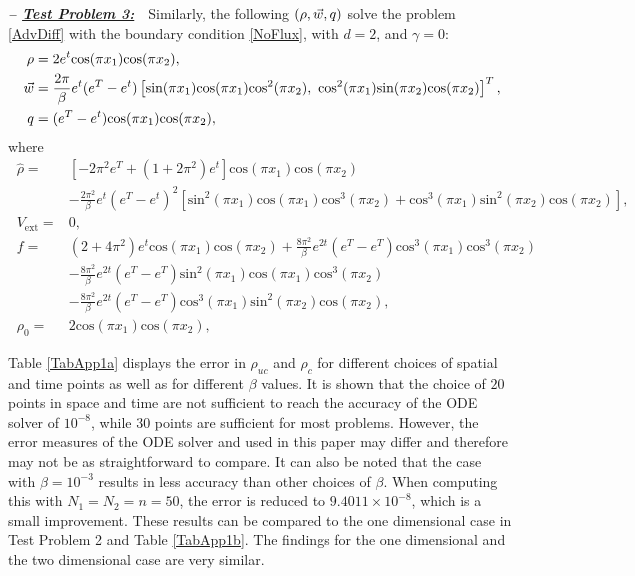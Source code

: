 \textbf{\emph{-- \underline{Test Problem 3:}}}~~Similarly, the following $(\rho,\vec{w},q)$ solve the problem \eqref{AdvDiff} with the boundary condition \eqref{NoFlux}, with $d=2$, and $\gamma =0$:
\begin{align*}
\ \rho={}&2e^{t}\text{cos}(\pi{}x_1)\text{cos}(\pi{}x_2), \\
\ \vec{w}={}&\frac{2\pi}{\beta}e^{t}(e^{T}-e^{t})\left[\text{sin}(\pi{}x_1)\text{cos}(\pi{}x_1)\text{cos}^2(\pi{}x_2),~\text{cos}^2(\pi{}x_1)\text{sin}(\pi{}x_2)\text{cos}(\pi{}x_2)\right]^T, \\
\ \adj={}&(e^{T}-e^{t})\text{cos}(\pi{}x_1)\text{cos}(\pi{}x_2),
\end{align*}
where
\begin{align*}
\ \widehat{\rho}={}&\left[-2\pi^2{}e^{T}+(1+2\pi^2)e^{t}\right]\text{cos}(\pi{}x_1)\text{cos}(\pi{}x_2) \\
\ &-\frac{2\pi^2}{\beta}e^{t}(e^{T}-e^{t})^2\left[\text{sin}^2(\pi{}x_1)\text{cos}(\pi{}x_1)\text{cos}^3(\pi{}x_2)+\text{cos}^3(\pi{}x_1)\text{sin}^2(\pi{}x_2)\text{cos}(\pi{}x_2)\right], \\
\ V_{\text{ext}}={}&0, \\
\ f={}&(2+4\pi^2)e^{t}\text{cos}(\pi{}x_1)\text{cos}(\pi{}x_2)+\frac{8\pi^2}{\beta}e^{2t}(e^{T}-e^{T})\text{cos}^3(\pi{}x_1)\text{cos}^3(\pi{}x_2) \\
\ &-\frac{8\pi^2}{\beta}e^{2t}(e^{T}-e^{T})\text{sin}^2(\pi{}x_1)\text{cos}(\pi{}x_1)\text{cos}^3(\pi{}x_2) \\
\ &-\frac{8\pi^2}{\beta}e^{2t}(e^{T}-e^{T})\text{cos}^3(\pi{}x_1)\text{sin}^2(\pi{}x_2)\text{cos}(\pi{}x_2), \\
\ \rho_{0}={}&2\text{cos}(\pi{}x_1)\text{cos}(\pi{}x_2),
\end{align*}


Table \ref{TabApp1a} displays the error in $\rho_{uc}$ and $\rho_c$ for different choices of spatial and time points as well as for different $\beta$ values. It is shown that the choice of $20$ points in space and time are not sufficient to reach the accuracy of the ODE solver of $10^{-8}$, while $30$ points are sufficient for most problems. However, the error measures of the ODE solver and used in this paper may differ and therefore may not be as straightforward to compare. It can also be noted that the case with $\beta = 10^{-3}$ results in less accuracy than other choices of $\beta$. When computing this with $N_1 = N_2 = n = 50$, the error is reduced to $9.4011 \times 10^{-8}$, which is a small improvement. These results can be compared to the one dimensional case in Test Problem 2 and Table \ref{TabApp1b}. The findings for the one dimensional and the two dimensional case are very similar.

